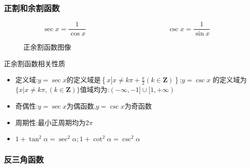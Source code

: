 \documentclass[12pt, a4paper, oneside, UTF8]{ctexbook}  %
\begin{document}
\begin{sloppypar}
    \subsubsection{正割和余割函数}
    $$
        \boxed{\sec x=\frac{1}{\cos x}}
        \qquad  \qquad \qquad \qquad \qquad \qquad
        \boxed{\csc x=\frac{1}{\sin x}}
    $$
    \begin{figure}[H] \centering
        \caption{正余割函数图像}
    \end{figure}
    \begin{criterion}{正余割函数相关性质}{}
        \begin{itemize}
            \item 定义域:$y=\sec x$的定义域是$\left\{x\left|x\neq k\pi+\frac{\pi}{2}\left(k\in\mathbf{Z}\right)\right\}\right.$;$y=\csc x$ 的定义域为$\{x|x\neq k\pi,(k \in \mathbf{Z})\}$值域均为:$(-\infty,-1]\cup[1,+\infty)$
            \item 奇偶性:$y=\sec x$为偶函数,$y=\csc x$为奇函数
            \item 周期性:最小正周期均为$ 2\pi$
            \item $1+\tan^{2}\alpha=\sec^{2}\alpha;1+\cot^{2}\alpha=\csc^{2}\alpha $
        \end{itemize}
    \end{criterion}
    \subsubsection{反三角函数}

\end{sloppypar}
\end{document}
